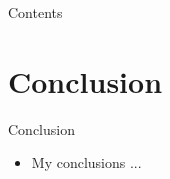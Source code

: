 

\frame{\titlepage}

\begin{frame}{Contents}
  \tableofcontents
\end{frame}







\section*{Conclusion}
\begin{frame}{Conclusion}
    \begin{itemize}
    \item My conclusions ...
  \end{itemize}
\end{frame}





%  
%  

